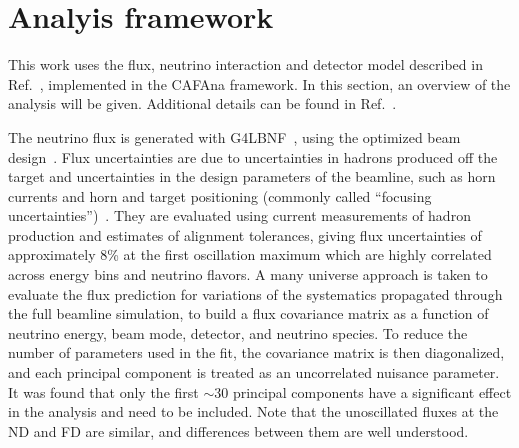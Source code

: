 \section{Analyis framework}\label{sec:analysis_framework}

This work uses the flux, neutrino interaction and detector model described in Ref.~\cite{Abi:2020qib}, implemented in the CAFAna framework. In this section, an overview of the analysis will be given. Additional details can be found in Ref.~\cite{Abi:2020qib}.

The neutrino flux is generated with G4LBNF~\cite{Aliaga:2016oaz,Abi:2020evt}, using the  optimized beam design~\cite{Abi:2020evt}. Flux uncertainties are due to uncertainties in hadrons produced off the target and uncertainties in the design parameters of the beamline, such as horn currents and horn and target positioning (commonly called ``focusing uncertainties'')~\cite{Abi:2020evt}. They are evaluated using current measurements of hadron production and  estimates of alignment tolerances, giving flux uncertainties of approximately 8\% at the first oscillation maximum which are highly correlated across energy bins and neutrino flavors. A many universe approach is taken to evaluate the flux prediction for variations of the systematics propagated through the full beamline simulation, to build a flux covariance matrix as a function of neutrino energy, beam mode, detector, and neutrino species. To reduce the number of parameters used in the fit, the covariance matrix is then diagonalized, and each principal component is treated as an uncorrelated nuisance parameter. It was found that only the first $\sim$30 principal components have a significant effect in the analysis and need to be included. Note that the unoscillated fluxes at the ND and FD are similar, and differences between them are well understood.

